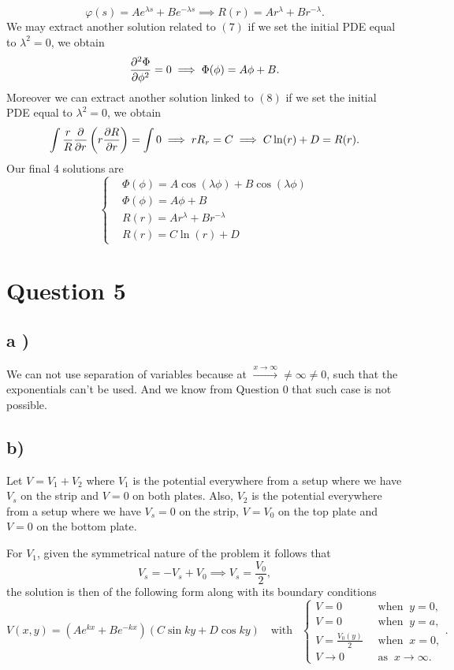 \documentclass[12pt]{article}
\theoremstyle{definition}
\theoremstyle{definition}
\theoremstyle{definition}
\theoremstyle{definition}
\theoremstyle{definition}
\theoremstyle{example}
\theoremstyle{note}
\theoremstyle{remark}
\theoremstyle{example}
\begin{document}
 			\vspace{-1 cm}
 		\begin{equation}
 				\varphi(s) = Ae^{\lambda s } + Be^{- \lambda s} \implies R(r) =Ar^{\lambda} + Br^{-\lambda }.
 		\end{equation}	
 		We may extract another solution related to $(7)$ if we set the initial PDE equal to $\lambda^{2} =0$, we obtain 
 		$$ \pdv[2]{\Phi}{\phi} = 0 \implies \Phi(\phi) = A \phi + B.$$
 		Moreover we can extract another solution linked to $(8)$ if we set the initial PDE equal to $\lambda^{2} =0$, we obtain 
 		$$ \int \frac{r}{R} \pdv{}{r} \left(r \pdv{R}{r}\right) = \int 0 \implies rR_{r} = C \implies C \ln (r) +D = R(r).$$
 		Our final 4 solutions are
 		\begin{equation}
 		 \begin{cases}
 		 	&\Phi(\phi) = A \cos(\lambda \phi) + B\cos (\lambda \phi) \\
 		 	&\Phi(\phi) = A \phi + B\\
 		 	&R(r) =Ar^{\lambda} + Br^{-\lambda } \\
 		 	&R(r) = C \ln (r) +D
 		 \end{cases}
 		\end{equation}
 	\section*{Question 5}
 		\subsection*{a ) }
 			We can not use separation of variables because at $\xrightarrow{x\to \infty} \neq \infty \neq 0$, such that the exponentials can't be used. And we know from Question $0$ that such case is not possible. 
 		\subsection*{b) }
 			Let $V = V_{1} +V_{2}$ where $V_{1}$ is the potential everywhere from a setup where we have $V_{s}$ on the strip and $V=0$ on both plates. Also, $V_{2}$ is the potential everywhere from a setup where we have $V_{s} =0$ on the strip, $V=V_{0}$ on the top plate and $V=0$ on the bottom plate. 
 			
 			\noindent For $V_{1}$, given the symmetrical nature of the problem it follows that 
 			$$V_{s}  = -V_{s} + V_{0} \implies V_{s} = \frac{V_{0}}{2},$$
 			the solution is then of the following form along with its boundary conditions 
 			$$ V(x,y) = (Ae^{kx} + Be^{-kx})(C \sin ky + D\cos ky) \quad \text{with } \ \ 
 			\begin{cases}
 				V= 0 \ &\text{ when } \ y =0, \\
 				V=0 \ &\text{ when } \ y=a, \\
 				V = \frac{V_{0}(y)}{2} \ &\text{ when } \ x=0,\\
 				V \to 0 \ &\text{ as } \ x\to \infty. 
 			\end{cases}.$$
\end{document}
